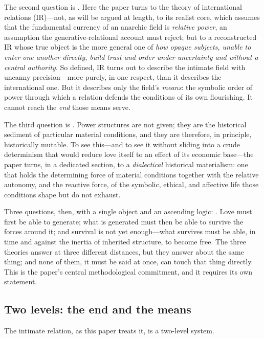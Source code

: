 The second question is . Here the paper turns to the theory of international relations (IR)---not, as will be argued at length, to its realist core, which assumes that the fundamental currency of an anarchic field is \emph{relative power}, an assumption the generative-relational account must reject; but to a reconstructed IR whose true object is the more general one of \emph{how opaque subjects, unable to enter one another directly, build trust and order under uncertainty and without a central authority}. So defined, IR turns out to describe the intimate field with uncanny precision---more purely, in one respect, than it describes the international one. But it describes only the field's \emph{means}: the symbolic order of power through which a relation defends the conditions of its own flourishing. It cannot reach the \emph{end} those means serve.

The third question is . Power structures are not given; they are the historical sediment of particular material conditions, and they are therefore, in principle, historically mutable. To see this---and to see it without sliding into a crude determinism that would reduce love itself to an effect of its economic base---the paper turns, in a dedicated section, to a \emph{dialectical} historical materialism: one that holds the determining force of material conditions together with the relative autonomy, and the reactive force, of the symbolic, ethical, and affective life those conditions shape but do not exhaust.

Three questions, then, with a single object and an ascending logic: . Love must first be able to generate; what is generated must then be able to survive the forces around it; and survival is not yet enough---what survives must be able, in time and against the inertia of inherited structure, to become free. The three theories answer at three different distances, but they answer about the same thing; and none of them, it must be said at once, can touch that thing directly. This is the paper's central methodological commitment, and it requires its own statement.

\subsection{Two levels: the end and the means}
\label{p17:sub:intro-twolevels}

The intimate relation, as this paper treats it, is a two-level system.

